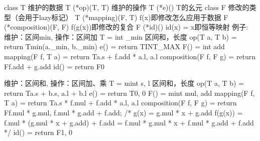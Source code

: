 class T 维护的数据    T (*op)(T, T) 维护的操作   T (*e)() T的幺元    class F 修改的类型（会用于lazy标记）
T (*mapping)(F, T) f(x)即修改怎么应用于数据    F (*composition)(F, F) f(g(x))即修改的复合    F (*id)() id(x) = x即恒等映射
例子:
维护：区间min, 操作：区间加
T = {int _min} 区间和，长度
op(T a, T b) = return T{min(a._min, b._min)}
e() = return T{INT_MAX}
F() = {int add}
mapping(F f, T a) = return T{a.s + f.add * a.l, a.l}
composition(F f, F g) = return F{f.add + g.add}
id() = return F{0}

维护：区间和, 操作：区间加、乘
T = {mint s, l} 区间和，长度
op(T a, T b) = return T{a.s + b.s, a.l + b.l}
e() = return T{0, 0}
F() = {mint mul, add}
mapping(F f, T a) = return T{a.s * f.mul + f.add * a.l, a.l}
composition(F f, F g) = return F{f.mul * g.mul, f.mul * g.add + f.add};
/*
g(x) = g.mul * x + g.add
f(g(x)) = f.mul * (g.mul * x + g.add) + f.add = f.mul * g.mul * x + f.mul * g.add + f.add
*/
id() = return F{1, 0}